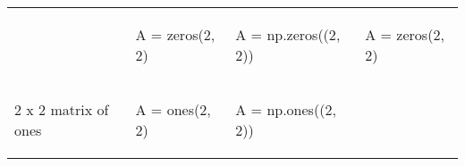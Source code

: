 \documentclass[10pt, landscape]{article}
\newenvironment{Shaded}{}{}
\newcommand{\DecValTok}[1]{\textcolor[rgb]{0.25,0.63,0.44}{{#1}}}
\newcommand{\FloatTok}[1]{\textcolor[rgb]{0.25,0.63,0.44}{{#1}}}
\newcommand{\OperatorTok}[1]{\textcolor[rgb]{0.40,0.40,0.40}{{#1}}}
\newcommand{\NormalTok}[1]{{#1}}
\begin{document}
\begin{multicols*}{2}
\begin{tabular}[ ]{@{}llll@{}}
\begin{minipage}[t]{0.24\columnwidth}
\end{minipage} & \begin{minipage}[t]{0.20\columnwidth}\raggedright\strut
\begin{Shaded}
\begin{Highlighting}[]
\NormalTok{A = zeros(}\FloatTok{2}\NormalTok{, }\FloatTok{2}\NormalTok{)}
\end{Highlighting}
\end{Shaded}
\strut
\end{minipage} & \begin{minipage}[t]{0.25\columnwidth}\raggedright\strut
\begin{Shaded}
\begin{Highlighting}[]
\NormalTok{A }\OperatorTok{=} \NormalTok{np.zeros((}\DecValTok{2}\NormalTok{, }\DecValTok{2}\NormalTok{))}
\end{Highlighting}
\end{Shaded}
\strut
\end{minipage} & \begin{minipage}[t]{0.20\columnwidth}\raggedright\strut
\begin{Shaded}
\begin{Highlighting}[]
\NormalTok{A = zeros(}\FloatTok{2}\NormalTok{, }\FloatTok{2}\NormalTok{)}
\end{Highlighting}
\end{Shaded}
\strut
\end{minipage}\tabularnewline
\begin{minipage}[t]{0.24\columnwidth}\raggedright\strut
2 x 2 matrix of ones\strut
\end{minipage} & \begin{minipage}[t]{0.20\columnwidth}\raggedright\strut
\begin{Shaded}
\begin{Highlighting}[]
\NormalTok{A = ones(}\FloatTok{2}\NormalTok{, }\FloatTok{2}\NormalTok{)}
\end{Highlighting}
\end{Shaded}
\strut
\end{minipage} & \begin{minipage}[t]{0.25\columnwidth}\raggedright\strut
\begin{Shaded}
\begin{Highlighting}[]
\NormalTok{A }\OperatorTok{=} \NormalTok{np.ones((}\DecValTok{2}\NormalTok{, }\DecValTok{2}\NormalTok{))}
\end{Highlighting}
\end{Shaded}
\strut
\end{minipage} & \begin{minipage}[t]{0.20\columnwidth}\raggedright\strut

\end{minipage}
\end{tabular}
\end{multicols*}
\end{document}
